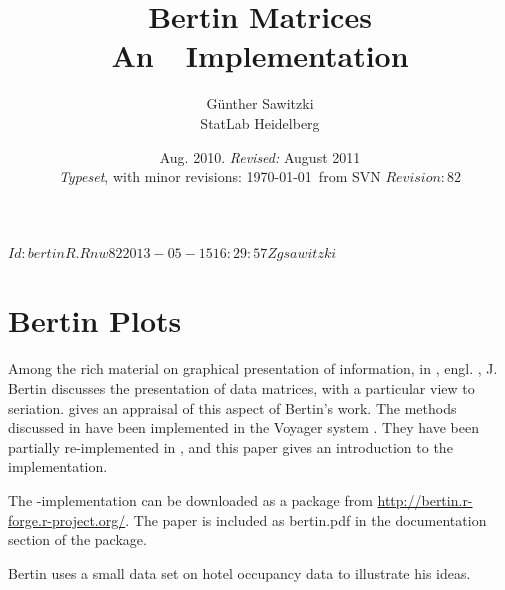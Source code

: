 \documentclass[nogin, dvips,12pt,a4paper,twoside]{amsart}
\title[Bertin Matrices]{Bertin Matrices\\\bigskip An\  \Rlogo \  Implementation}
\author[G\"unther Sawitzki]{G\"unther Sawitzki\\StatLab Heidelberg}
\date{Aug. 2010.
\emph{Revised:} August 2011\\
\emph{Typeset}, with minor revisions: \today\  from SVN $Revision: 82 $ \svnInfoDate}
\begin{document}
\svnInfo $Id: bertinR.Rnw 82 2013-05-15 16:29:57Z gsawitzki $ 
\maketitle

\begingroup
\setlength{\parskip}{0pt}
\tableofcontents
\endgroup

\section{Bertin Plots}

Among the rich material on graphical presentation of information, in \cite{brtn77gtg}, engl. \cite{seriation:Bertin:1999}, J. Bertin discusses the presentation of data matrices, with a particular view to seriation. \cite{seriation:Falguerolles:1997} gives an appraisal of this aspect of Bertin's work. The methods discussed in \cite{seriation:Falguerolles:1997} have been implemented in the Voyager system \cite{Sawitzki1996Extensible-Stat}. They have been partially re-implemented in \R{}, and this paper gives an introduction to the \R{} implementation.

The \R{}-implementation can be downloaded as a package  from \url{http://bertin.r-forge.r-project.org/}.  The paper \cite{seriation:Falguerolles:1997} is included as bertin.pdf in the documentation section of the package.

Bertin uses a small data set on hotel occupancy data to illustrate his ideas.
\end{document}

